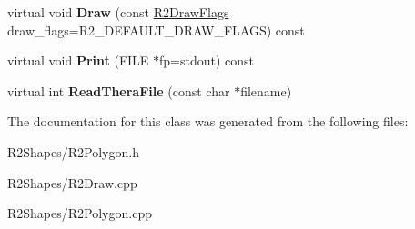 \begin{DoxyCompactItemize}
\item 
virtual void {\bfseries Draw} (const \hyperlink{class_r_n_flags}{R2\+Draw\+Flags} draw\+\_\+flags=R2\+\_\+\+D\+E\+F\+A\+U\+L\+T\+\_\+\+D\+R\+A\+W\+\_\+\+F\+L\+A\+GS) const \hypertarget{class_r2_polygon_a687ac6d5857ce5e16b089d7077fa4db5}{}\label{class_r2_polygon_a687ac6d5857ce5e16b089d7077fa4db5}

\item 
virtual void {\bfseries Print} (F\+I\+LE $\ast$fp=stdout) const \hypertarget{class_r2_polygon_a4b390493ed26c28fbe264386c297fbf6}{}\label{class_r2_polygon_a4b390493ed26c28fbe264386c297fbf6}

\item 
virtual int {\bfseries Read\+Thera\+File} (const char $\ast$filename)\hypertarget{class_r2_polygon_a063e7d5f9fa8a579a3d98ea636662e08}{}\label{class_r2_polygon_a063e7d5f9fa8a579a3d98ea636662e08}

\end{DoxyCompactItemize}


The documentation for this class was generated from the following files\+:\begin{DoxyCompactItemize}
\item 
R2\+Shapes/R2\+Polygon.\+h\item 
R2\+Shapes/R2\+Draw.\+cpp\item 
R2\+Shapes/R2\+Polygon.\+cpp\end{DoxyCompactItemize}
